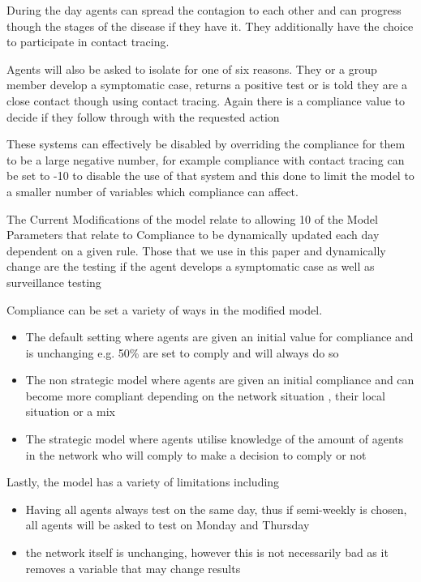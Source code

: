 \documentclass{article}
\begin{document}
During the day agents can spread the contagion to each other and can progress though the stages of the disease if they have it. They additionally have the choice to participate in contact tracing.

Agents will also be asked to isolate for one of six reasons. They or a group member develop a symptomatic case, returns a positive test or is told they are a close contact though using contact tracing. Again there is a compliance value to decide if they follow through with the requested action

These systems can effectively be disabled by overriding the compliance for them to be a large negative number, for example compliance with contact tracing can be set to -10 to disable the use of that system and this done to limit the model to a smaller number of variables which compliance can affect.

The Current Modifications of the model relate to allowing 10 of the Model Parameters that relate to Compliance to be dynamically updated each day dependent on a given rule. Those that we use in this paper and dynamically change are the testing if the agent develops a symptomatic case as well as surveillance testing 

Compliance can be set a variety of ways in the modified model.
\begin{itemize}
\item The default setting where agents are given an initial value for compliance and is unchanging e.g. 50\% are set to comply and will always do so
\item The non strategic model where agents are given an initial compliance and can become more compliant depending on the network situation , their local situation or a mix
\item The strategic model where agents utilise knowledge of the amount of agents in the network who will comply to make a decision to comply or not
\end{itemize}

Lastly, the model has a variety of limitations including 
\begin{itemize}
\item Having all agents always test on the same day, thus if semi-weekly is chosen, all agents will be asked to test on Monday and Thursday
\item the network itself is unchanging, however this is not necessarily bad as it removes a variable that may change results
\end{itemize}
\end{document}
